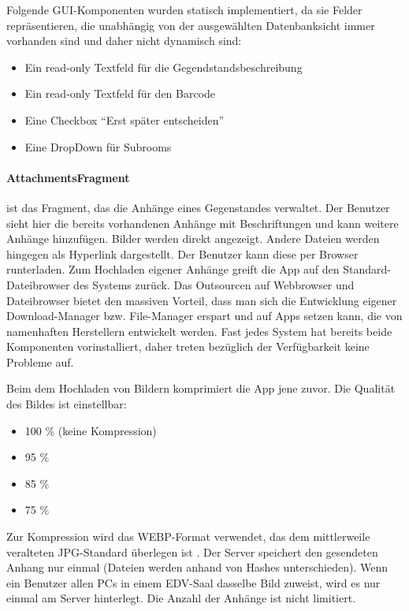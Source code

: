 Folgende GUI-Komponenten wurden statisch implementiert, da sie Felder
repräsentieren, die unabhängig von der ausgewählten Datenbanksicht immer
vorhanden sind und daher nicht dynamisch sind:

\begin{itemize}
\tightlist
\item
  Ein read-only Textfeld für die Gegendstandsbeschreibung
\item
  Ein read-only Textfeld für den Barcode
\item
  Eine Checkbox ``Erst später entscheiden''
\item
  Eine DropDown für Subrooms
\end{itemize}

\hypertarget{attachmentsfragment}{%
\paragraph{AttachmentsFragment}\label{attachmentsfragment}}

ist das Fragment, das die Anhänge eines Gegenstandes verwaltet. Der
Benutzer sieht hier die bereits vorhandenen Anhänge mit Beschriftungen
und kann weitere Anhänge hinzufügen. Bilder werden direkt angezeigt.
Andere Dateien werden hingegen als Hyperlink dargestellt. Der Benutzer
kann diese per Browser runterladen. Zum Hochladen eigener Anhänge greift
die App auf den Standard-Dateibrowser des Systems zurück. Das Outsourcen
auf Webbrowser und Dateibrowser bietet den massiven Vorteil, dass man
sich die Entwicklung eigener Download-Manager bzw. File-Manager erspart
und auf Apps setzen kann, die von namenhaften Herstellern entwickelt
werden. Fast jedes System hat bereits beide Komponenten vorinstalliert,
daher treten bezüglich der Verfügbarkeit keine Probleme auf.

Beim dem Hochladen von Bildern komprimiert die App jene zuvor. Die
Qualität des Bildes ist einstellbar:

\begin{itemize}
\tightlist
\item
  100 \% (keine Kompression)
\item
  95 \%
\item
  85 \%
\item
  75 \%
\end{itemize}

Zur Kompression wird das WEBP-Format verwendet, das dem mittlerweile
veralteten JPG-Standard überlegen ist \cite{webp}. Der Server speichert
den gesendeten Anhang nur einmal (Dateien werden anhand von Hashes
unterschieden). Wenn ein Benutzer allen PCs in einem EDV-Saal dasselbe
Bild zuweist, wird es nur einmal am Server hinterlegt. Die Anzahl der
Anhänge ist nicht limitiert.

